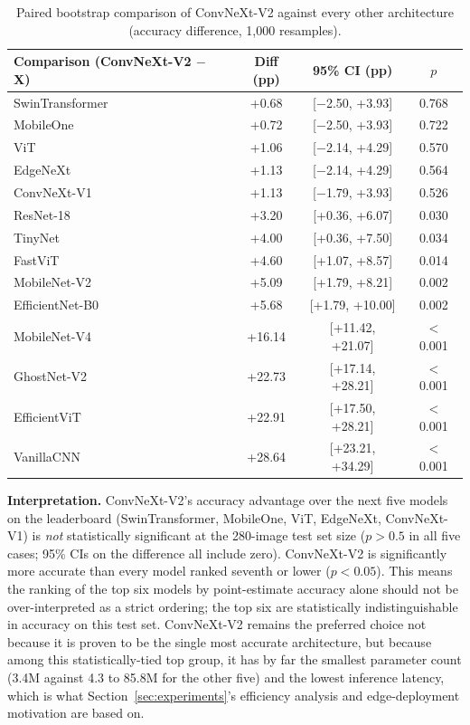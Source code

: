 \begin{table}[htbp]
\centering
\caption{Paired bootstrap comparison of ConvNeXt-V2 against every other architecture (accuracy difference, 1,000 resamples).}
\label{tab:bootstrap_pairwise}
\small
\setlength{\tabcolsep}{4pt}
\begin{tabular}{lccc}
\toprule
\textbf{Comparison (ConvNeXt-V2 $-$ X)} & \textbf{Diff (pp)} & \textbf{95\% CI (pp)} & \textbf{$p$} \\
\midrule
SwinTransformer  & +0.68  & [$-$2.50, +3.93]   & 0.768 \\
MobileOne        & +0.72  & [$-$2.50, +3.93]   & 0.722 \\
ViT              & +1.06  & [$-$2.14, +4.29]   & 0.570 \\
EdgeNeXt         & +1.13  & [$-$2.14, +4.29]   & 0.564 \\
ConvNeXt-V1      & +1.13  & [$-$1.79, +3.93]   & 0.526 \\
ResNet-18        & +3.20  & [+0.36, +6.07]     & 0.030 \\
TinyNet          & +4.00  & [+0.36, +7.50]     & 0.034 \\
FastViT          & +4.60  & [+1.07, +8.57]     & 0.014 \\
MobileNet-V2     & +5.09  & [+1.79, +8.21]     & 0.002 \\
EfficientNet-B0  & +5.68  & [+1.79, +10.00]    & 0.002 \\
MobileNet-V4     & +16.14 & [+11.42, +21.07]   & $<$0.001 \\
GhostNet-V2      & +22.73 & [+17.14, +28.21]   & $<$0.001 \\
EfficientViT     & +22.91 & [+17.50, +28.21]   & $<$0.001 \\
VanillaCNN       & +28.64 & [+23.21, +34.29]   & $<$0.001 \\
\bottomrule
\end{tabular}
\end{table}

\textbf{Interpretation.} ConvNeXt-V2's accuracy advantage over the next five models on the leaderboard (SwinTransformer, MobileOne, ViT, EdgeNeXt, ConvNeXt-V1) is \emph{not} statistically significant at the 280-image test set size ($p > 0.5$ in all five cases; 95\% CIs on the difference all include zero). ConvNeXt-V2 is significantly more accurate than every model ranked seventh or lower ($p < 0.05$). This means the ranking of the top six models by point-estimate accuracy alone should not be over-interpreted as a strict ordering; the top six are statistically indistinguishable in accuracy on this test set. ConvNeXt-V2 remains the preferred choice not because it is proven to be the single most accurate architecture, but because among this statistically-tied top group, it has by far the smallest parameter count (3.4M against 4.3 to 85.8M for the other five) and the lowest inference latency, which is what Section~\ref{sec:experiments}'s efficiency analysis and edge-deployment motivation are based on.

